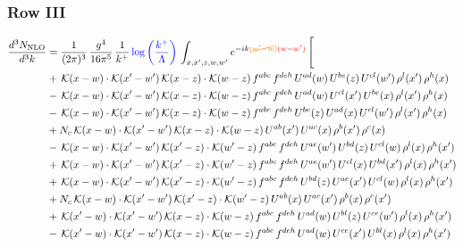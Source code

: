 \documentclass[9pt]{article}
\numberwithin{equation}{section}
\begin{document}
 \subsubsection{Row III}
 \begin{align}
\frac{d^{3}N_{\mathrm{NLO}}}{d^{3}k} & = \frac{1}{(2\pi)^{3}}\,\frac{g^{4}}{16\pi^{5}}\,\frac{1}{k^{+}}\,{\color{blue}\log{\left(\frac{k^{+}}{\Lambda}\right)}}\,\int_{x,x',z,w,w'}e^{-ik{\color{orange}\cancel{(w'-w)}}{\color{red}(w-w')}}\,\Bigg[\notag\\ &  +\,\mathcal{K}(x-w)\cdot\mathcal{K}(x'-w')\,\mathcal{K}(x-z)\cdot\mathcal{K}(w-z)\,f^{abc}\,f^{deh}\,U^{ad}(w)\,U^{be}(z)\,U^{cl}(w')\,\rho^{l}(x')\,\rho^{h}(x)\notag\\
& -\,\mathcal{K}(x-w)\cdot\mathcal{K}(x'-w')\,\mathcal{K}(x-z)\cdot\mathcal{K}(w-z)\,f^{abc}\,f^{deh}\,U^{ad}(w)\,U^{cl}(x')\,U^{be}(x)\,\rho^{l}(x')\,\rho^{h}(x)\notag\\
& -\,\mathcal{K}(x-w)\cdot\mathcal{K}(x'-w')\,\mathcal{K}(x-z)\cdot\mathcal{K}(w-z)\,f^{abc}\,f^{deh}\,U^{be}(z)\,U^{ad}(x)\,U^{cl}(w')\,\rho^{l}(x')\,\rho^{h}(x)\notag\\
& +N_{c}\,\mathcal{K}(x-w)\cdot\mathcal{K}(x'-w')\,\mathcal{K}(x-z)\cdot\mathcal{K}(w-z)\,U^{ab}(x')\,U^{ac}(x)\,\rho^{b}(x')\,\rho^{c}(x)\notag\\
& -\,\mathcal{K}(x-w)\cdot\mathcal{K}(x'-w')\,\mathcal{K}(x'-z)\cdot\mathcal{K}(w'-z)\,f^{abc}\,f^{deh}\,U^{ae}(w')\,U^{bd}(z)\,U^{cl}(w)\,\rho^{l}(x)\,\rho^{h}(x')\notag\\
& +\,\mathcal{K}(x-w)\cdot\mathcal{K}(x'-w')\,\mathcal{K}(x'-z)\cdot\mathcal{K}(w'-z)\,f^{abc}\,f^{deh}\,U^{ae}(w')\,U^{cl}(x)\,U^{bd}(x')\,\rho^{l}(x)\,\rho^{h}(x')\notag\\
& +\,\mathcal{K}(x-w)\cdot\mathcal{K}(x'-w')\,\mathcal{K}(x'-z)\cdot\mathcal{K}(w'-z)\,f^{abc}\,f^{deh}\,U^{bd}(z)\,U^{ae}(x')\,U^{cl}(w)\,\rho^{l}(x)\,\rho^{h}(x')\notag\\
& +N_{c}\,\mathcal{K}(x-w)\cdot\mathcal{K}(x'-w')\,\mathcal{K}(x'-z)\cdot\mathcal{K}(w'-z)\,U^{ab}(x)\,U^{ac}(x')\,\rho^{b}(x)\,\rho^{c}(x')\notag\\
& +\,\mathcal{K}(x'-w)\cdot\mathcal{K}(x'-w')\,\mathcal{K}(x-z)\cdot\mathcal{K}(w-z)\,f^{abc}\,f^{deh}\,U^{ad}(w)\,U^{bl}(z)\,U^{ce}(w')\,\rho^{l}(x)\,\rho^{h}(x')\notag\\
& -\,\mathcal{K}(x'-w)\cdot\mathcal{K}(x'-w')\,\mathcal{K}(x-z)\cdot\mathcal{K}(w-z)\,f^{abc}\,f^{deh}\,U^{ad}(w)\,U^{ce}(x')\,U^{bl}(x)\,\rho^{l}(x)\,\rho^{h}(x')\notag\\

\end{align}
\end{document}
